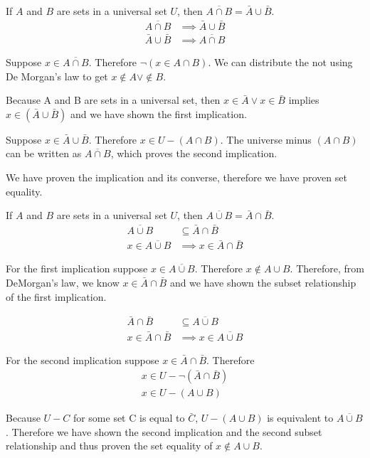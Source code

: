 \documentclass[openany, 12pt]{book}
\begin{document}
\begin{exercise}{}{}
	If $A$ and $B$ are sets in a universal set $U$, then $\overline{A \cap
			B}=\bar{A} \cup \bar{B}$.
	\begin{align*}
		\overline{A \cap B}  & \implies \bar{A} \cup \bar{B} \\
		\bar{A} \cup \bar{B} & \implies \overline{A \cap B}
	\end{align*}
	\begin{alist}
		\item Suppose $x\in \overline{A\cap B}$. Therefore $\neg(x\in{A\cap B})$. We can
		distribute the not using De Morgan's law to get $x\notin A \lor \notin B$.
		\item Because A and B are sets in a universal set, then $x\in\bar{A} \lor
			x\in\bar{B}$ implies $x\in(\bar{A} \cup \bar{B})$ and we have shown the first implication.
		\item Suppose $x\in \bar{A} \cup \bar{B}$. Therefore $x\in U -(A \cap B)$. The
		universe minus $(A\cap B)$ can be written as $\overline{A\cap B}$,  which
		proves the second implication.
		\item We have proven the implication and its converse, therefore we have proven
		set equality.
	\end{alist}
\end{exercise}

\begin{exercise}{}{}
	If $A$ and $B$ are sets in a universal set $U$, then $\overline{A \cup B}=\bar{A} \cap \bar{B}$.
	\begin{align*}
		\overline{A \cup B}
		 & \subseteq
		\bar{A} \cap \bar{B} \\
		x\in \overline{A \cup B}
		 & \implies
		x\in \bar{A} \cap \bar{B}
	\end{align*}
	\begin{alist}

		\item For the first implication suppose $x\in\overline{A\cup B}$.
		Therefore $x \notin A\cup B$. Therefore, from DeMorgan's law, we
		know $x\in\bar{A} \cap \bar{B}$ and we have shown the subset
		relationship of the first implication.

		\begin{align*}
			\bar{A} \cap \bar{B}
			 & \subseteq
			\overline{A \cup B} \\
			x\in\bar{A} \cap \bar{B}
			 & \implies
			x\in\overline{A \cup B}
		\end{align*}
		\item For the second implication suppose $x\in\bar{A}\cap\bar{B}$. Therefore
		\begin{align*}
			x \in U - \neg\left(\bar{A}\cap\bar{B}\right) \\
			x \in U - \left(A\cup B\right)
		\end{align*}
		\item Because $U-C$ for some set C is equal to $\bar{C}$, $U - \left(A\cup
			B\right)$ is equivalent to $\overline{A\cup B}$. Therefore we have shown the
		second implication and the second subset relationship and thus proven the
		set equality of $x \notin A\cup B$.
	\end{alist}
\end{exercise}
\end{document}

